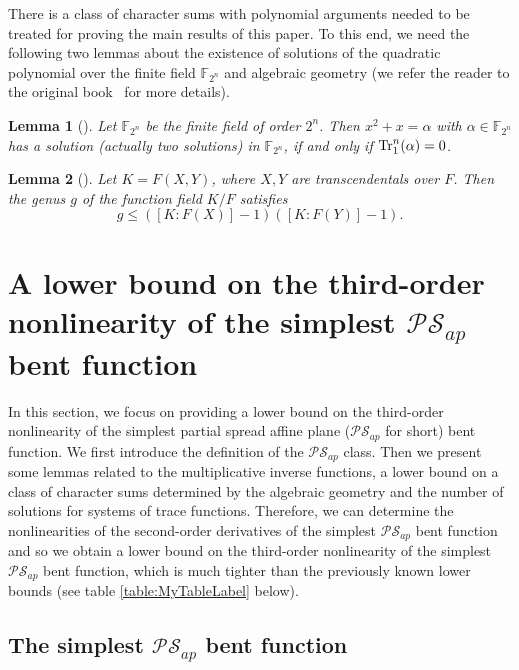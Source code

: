 \documentclass{article}
\newcommand{\F}{\mathbb{F}}
\newcommand{\0}{\textbf{0}}
\newcommand{\1}{\textbf{1}}
\theoremstyle{plain}
\newtheorem{lemma}{Lemma}
\begin{document}
    There is a class of character sums with polynomial arguments needed to be treated for proving the main results of this paper.
    To this end, we need the following two lemmas about the existence of solutions of the quadratic polynomial over the finite field $\F_{2^n}$ and algebraic geometry (we refer the reader to the original book~\cite{Stichtenoth2008book_algebraicfunctionfieldsandcodes} for more details).
    \begin{lemma}[\cite{Lidl1997FiniteFieldBook}]\label{lemma:hilbert90}
        Let $\F_{2^n}$ be the finite field of order $2^n$.
        Then $x^2+x=\alpha$ with $\alpha\in\F_{2^n}$ has a solution (actually two solutions) in $\F_{2^n}$, if and only if $\Tr_1^n(\alpha)=0$.
    \end{lemma}
    \begin{lemma}[\cite{Stichtenoth2008book_algebraicfunctionfieldsandcodes}]\label{L:genus_K_F}
        Let $K=F(X,Y)$, where $X,Y$ are transcendentals over $F$.
        Then the genus $g$ of the function field $K/F$ satisfies
        \[g\le ([K : F(X)] - 1)([K : F(Y)] - 1).\]
    \end{lemma}

\section{A lower bound on the third-order nonlinearity of the simplest $\mathcal{PS}_{ap}$ bent function}

In this section, we focus on providing a lower bound on the third-order nonlinearity of the simplest 
partial spread affine plane ($\mathcal{PS}_{ap}$ for short) bent function.
We first introduce the definition of the $\mathcal{PS}_{ap}$ class.
Then we present some lemmas related to the multiplicative inverse functions, 
a lower bound on a class of character sums determined by the algebraic geometry
and the number of solutions for systems of trace functions. 
Therefore, we can determine the nonlinearities of the second-order derivatives of the simplest $\mathcal{PS}_{ap}$ bent function
and so we obtain a lower bound on the third-order nonlinearity of the simplest $\mathcal{PS}_{ap}$ 
bent function, which is much tighter than the previously known lower bounds (see table \ref{table:MyTableLabel} below).

  \subsection{The simplest $\mathcal{PS}_{ap}$ bent function}
\end{document}
